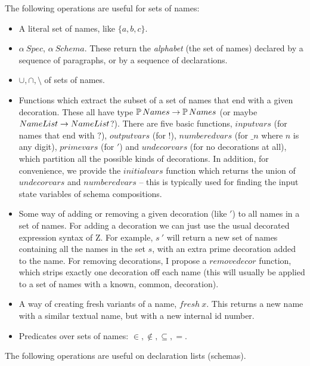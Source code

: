 \documentclass{article}
\begin{document}
The following operations are useful for sets of names:
\begin{itemize}
\item A literal set of names, like $\{a,b,c\}$.

\item $\alpha~Spec$, $\alpha~Schema$.  These return the \emph{alphabet}
  (the set of names) declared by a sequence of paragraphs, or by
  a sequence of declarations.

\item $\cup, \cap, \setminus$ of sets of names.

\item Functions which extract the subset of a set of names
  that end with a given decoration.  These all have type $\power Names
  \fun \power Names$ (or maybe $NameList \fun NameList$?).  
  There are five basic functions, $inputvars$
  (for names that end with $?$), $outputvars$ (for $!$),
  $numberedvars$ (for $\_n$ where $n$ is any digit), $primevars$ (for
  $'$) and $undecorvars$ (for no decorations at all), which partition
  all the possible kinds of decorations.  In addition, for
  convenience, we provide the $initialvars$ function which returns the
  union of $undecorvars$ and $numberedvars$ -- this is typically used
  for finding the input state variables of schema compositions.

\item Some way of adding or removing a given decoration (like $'$) to all
  names in a set of names.  For adding a decoration we can just use
  the usual decorated expression syntax of Z.  For example, $s~'$ will
  return a new set of names containing all the names in the set $s$,
  with an extra prime decoration added to the name.  For removing
  decorations, I propose a $removedecor$ function, which strips
  exactly one decoration off each name (this will usually be applied
  to a set of names with a known, common, decoration).

\item A way of creating fresh variants of a name, $fresh~x$.
  This returns a new name with a similar textual name, but
  with a new internal id number.

\item Predicates over sets of names: $\in, \notin, \subseteq, =$.
\end{itemize}

The following operations are useful on declaration lists (schemas).
\end{document}
